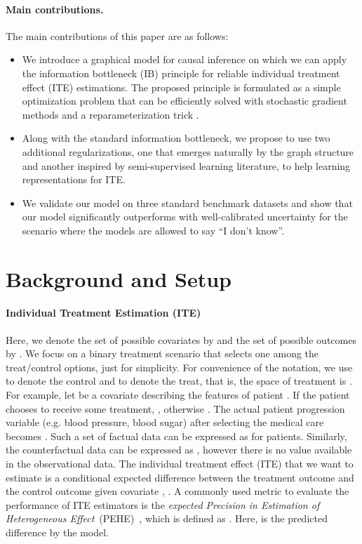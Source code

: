 \documentclass{article}
\begin{document}
\paragraph{Main contributions.} The main contributions of this paper are as follows:
\begin{itemize}
    \item We introduce a graphical model for causal inference on which we can apply the information bottleneck (IB) principle for reliable individual treatment effect (ITE) estimations. The proposed principle is formulated as a simple optimization problem that can be efficiently solved with stochastic gradient methods \cite{Kingma2015} and a reparameterization trick \cite{Kingma2014}.
    \item Along with the standard information bottleneck, we propose to use two additional regularizations, one that emerges naturally by the graph structure and another inspired by semi-supervised learning literature, to help learning representations for ITE.
    \item We validate our model on three standard benchmark datasets and show that our model significantly outperforms with well-calibrated uncertainty for the scenario where the models are allowed to say ``I don't know''.
\end{itemize}
    



\section{Background and Setup}

\paragraph{Individual Treatment Estimation (ITE)}
Here, we denote the set of possible covariates by  and the set of possible outcomes by . We focus on a binary treatment scenario that selects one among the treat/control options, just for simplicity.
For convenience of the notation, we use  to denote the control and  to denote the treat, that is, the space of treatment is . For example, let  be a covariate describing the features of patient . If the patient chooses to receive some treatment, , otherwise . The actual patient progression variable (e.g. blood pressure, blood sugar) after selecting the medical care becomes . Such a set of factual data can be expressed as  for  patients. Similarly, the counterfactual data can be expressed as , however there is no  value available in the observational data. The individual treatment effect (ITE) that we want to estimate is a conditional expected difference between the treatment outcome  and the control outcome  given covariate ,
.
A commonly used metric to evaluate the performance of ITE estimators is the \textit{expected Precision in Estimation of Heterogeneous Effect}~(PEHE)~\cite{hill2011bayesian}, which is defined as 
. Here,   is the predicted difference by the model. 
\end{document}
